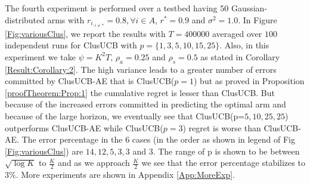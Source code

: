 	The fourth experiment is performed over a testbed having $50$ Gaussian-distributed arms with $r_{i_{:{{i}\neq {*}}}}=0.8,\forall i\in A$, $r^{*}=0.9$ and $\sigma^{2}=1.0$. In Figure \ref{Fig:variousClus}, we report the results with $T=400000$ averaged over $100$ independent runs for ClusUCB with  $p=\lbrace 1,3,5,10,15,25\rbrace$. Also, in this experiment we take $\psi = K^{2}T$, $\rho_a=0.25$ and $\rho_{s}=0.5$ as stated in Corollary \ref{Result:Corollary:2}. The high variance leads to a greater number of errors committed by ClusUCB-AE that is ClusUCB($p=1$) but as proved in Proposition \ref{proofTheorem:Prop:1} the cumulative regret is lesser than  ClusUCB. But because of the increased errors committed in predicting the optimal arm and because of the large horizon, we eventually see that ClusUCB(p=$5,10,25,25$) outperforms ClusUCB-AE while ClusUCB($p=3$) regret is worse than ClusUCB-AE. The error percentage in the $6$ cases (in the order as shown in legend of Fig \ref{Fig:variousClus}) are $14,12,5,3,3$ and $3$. The range of p is shown to be between $\sqrt{\log K}$ to $\frac{K}{2}$ and as we approach $\frac{K}{2}$ we see that the error percentage stabilizes to $3\%$.
	More experiments are shown in Appendix \ref{App:MoreExp}.
	
	
	


